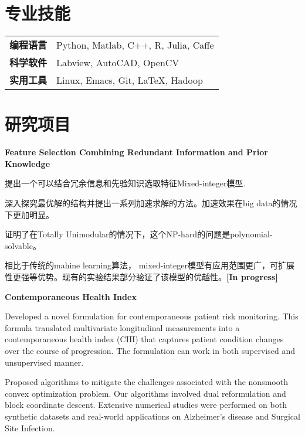 \documentclass[margin,line,11pt]{resume}
\begin{document}
\begin{resume}
         \vspace{-0.5em}\section{\mysidestyle 专业技能}
\vspace{0.5em}
	\begin{tabular}{ll }
\textbf{编程语言} &Python, Matlab, C++, R, Julia, Caffe\\
\textbf{科学软件}& Labview,  AutoCAD, OpenCV\\
	\textbf{实用工具}& Linux, Emacs, Git, \LaTeX, Hadoop
        \end{tabular}

\clearpage        

        \vspace{-0.5em}\section{\mysidestyle 研究项目}

        \textbf{Feature Selection Combining Redundant Information and Prior Knowledge}
\begin{list2}        
\item 提出一个可以结合冗余信息和先验知识选取特征Mixed-integer模型.
\item 深入探究最优解的结构并提出一系列加速求解的方法。加速效果在big data的情况下更加明显。
\item 证明了在Totally Unimodular的情况下，这个NP-hard的问题是polynomial-solvable。
\item 相比于传统的mahine learning算法， mixed-integer模型有应用范围更广，可扩展性更强等优势。现有的实验结果部分验证了该模型的优越性。\textbf{[In progress]}
\end{list2}

\textbf{Contemporaneous Health Index}
\begin{list2}        
\item Developed a novel formulation for contemporaneous patient risk monitoring. This formula translated multivariate longitudinal measurements into a contemporaneous health index (CHI) that captures patient condition changes over the course of progression. The formulation can work in both supervised and unsupervised manner. 
\item Proposed  algorithms to mitigate the challenges associated with the nonsmooth convex optimization problem. Our algorithms involved dual reformulation and block coordinate descent. Extensive numerical studies were performed on both synthetic datasets and real-world applications on Alzheimer's disease and Surgical Site Infection.
\end{list2}


\end{resume}
\end{document}
